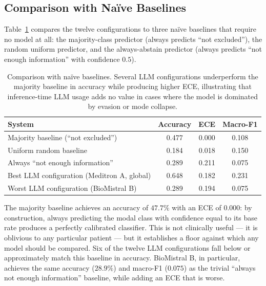 \subsection{Comparison with Naïve Baselines}
\label{subsec:res-naive-baselines}

Table~\ref{tab:res-baselines} compares the twelve configurations to 
three naïve baselines that require no model at all: the majority-class 
predictor (always predicts ``not excluded''), the random uniform 
predictor, and the always-abstain predictor (always predicts ``not 
enough information'' with confidence $0.5$).

\begin{table}[htbp]
    \centering
    \caption{Comparison with naïve baselines. Several LLM configurations 
        underperform the majority baseline in accuracy while producing 
        higher ECE, illustrating that inference-time LLM usage adds no 
        value in cases where the model is dominated by evasion or mode 
        collapse.}
    \label{tab:res-baselines}
    \small
    \begin{tabular}{@{}lccc@{}}
        \toprule
        \textbf{System} & 
        \textbf{Accuracy} & 
        \textbf{ECE} & 
        \textbf{Macro-F1} \\
        \midrule
        Majority baseline (``not excluded'')  & 0.477 & 0.000 & 0.108 \\
        Uniform random baseline                & 0.184 & 0.018 & 0.150 \\
        Always ``not enough information''      & 0.289 & 0.211 & 0.075 \\
        \midrule
        Best LLM configuration (Meditron A, global)  & 0.648 & 0.182 & 0.231 \\
        Worst LLM configuration (BioMistral B)       & 0.289 & 0.194 & 0.075 \\
        \bottomrule
    \end{tabular}
\end{table}

The majority baseline achieves an accuracy of $47.7\%$ with an ECE of 
$0.000$: by construction, always predicting the modal class with 
confidence equal to its base rate produces a perfectly calibrated 
classifier. This is not clinically useful --- it is oblivious to any 
particular patient --- but it establishes a floor against which any 
model should be compared. Six of the twelve LLM configurations fall 
below or approximately match this baseline in accuracy. BioMistral B, 
in particular, achieves the same accuracy ($28.9\%$) and macro-F1 
($0.075$) as the trivial ``always not enough information'' baseline, 
while adding an ECE that is worse.

